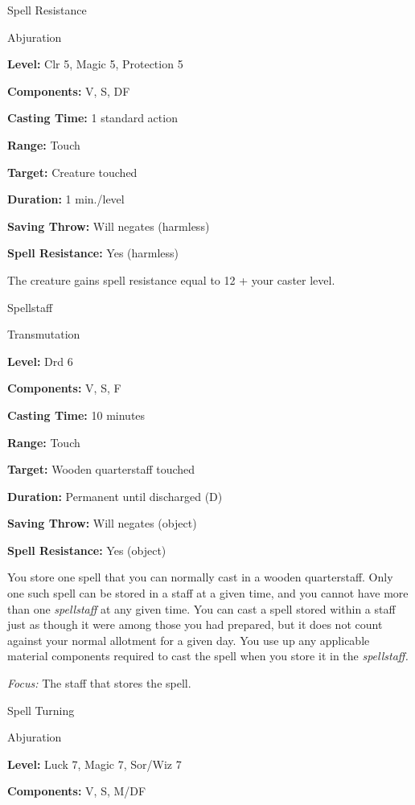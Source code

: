 \documentclass{article}
\begin{document}
\vspace{12pt}
Spell Resistance

Abjuration

\textbf{Level:} Clr 5, Magic 5, Protection 5

\textbf{Components:} V, S, DF

\textbf{Casting Time:} 1 standard action

\textbf{Range:} Touch

\textbf{Target:} Creature touched

\textbf{Duration:} 1 min./level

\textbf{Saving Throw: }Will negates (harmless)

\textbf{Spell Resistance:} Yes (harmless)

The creature gains spell resistance equal to 12 + your caster level.

\vspace{12pt}
Spellstaff

Transmutation

\textbf{Level:} Drd 6

\textbf{Components:} V, S, F

\textbf{Casting Time:} 10 minutes

\textbf{Range:} Touch

\textbf{Target: }Wooden quarterstaff touched

\textbf{Duration:} Permanent until discharged (D)

\textbf{Saving Throw: }Will negates (object)

\textbf{Spell Resistance:} Yes (object)

You store one spell that you can normally cast in a wooden quarterstaff. Only one 
such spell can be stored in a staff at a given time, and you cannot have more than 
one \textit{spellstaff }at any given time. You can cast a spell stored within a 
staff just as though it were among those you had prepared, but it does not count 
against your normal allotment for a given day. You use up any applicable material 
components required to cast the spell when you store it in the \textit{spellstaff.}

\textit{Focus: }The staff that stores the spell.

\vspace{12pt}
Spell Turning

Abjuration

\textbf{Level:} Luck 7, Magic 7, Sor/Wiz 7

\textbf{Components:} V, S, M/DF
\end{document}
